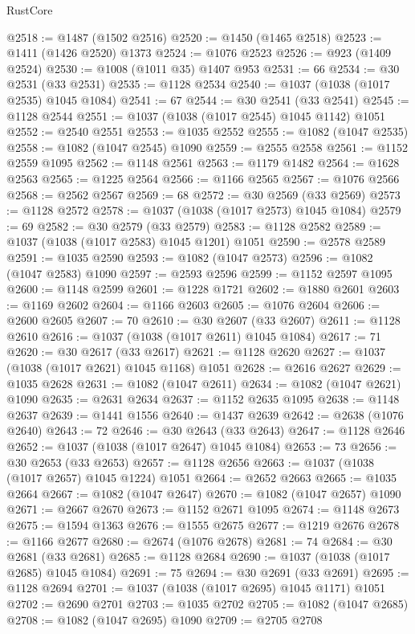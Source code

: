 \begin{lexlean}{RustCore}
\begin{coremodule}
@2518 := @1487 (@1502 @2516)
@2520 := @1450 (@1465 @2518)
@2523 := @1411 (@1426 @2520) @1373
@2524 := @1076 @2523
@2526 := @923 (@1409 @2524)
@2530 := @1008 (@1011 @35) @1407 @953
@2531 := 66
@2534 := @30 @2531 (@33 @2531)
@2535 := @1128 @2534
@2540 := @1037 (@1038 (@1017 @2535) @1045 @1084)
@2541 := 67
@2544 := @30 @2541 (@33 @2541)
@2545 := @1128 @2544
@2551 := @1037 (@1038 (@1017 @2545) @1045 @1142) @1051
@2552 := @2540 @2551
@2553 := @1035 @2552
@2555 := @1082 (@1047 @2535)
@2558 := @1082 (@1047 @2545) @1090
@2559 := @2555 @2558
@2561 := @1152 @2559 @1095
@2562 := @1148 @2561
@2563 := @1179 @1482
@2564 := @1628 @2563
@2565 := @1225 @2564
@2566 := @1166 @2565
@2567 := @1076 @2566
@2568 := @2562 @2567
@2569 := 68
@2572 := @30 @2569 (@33 @2569)
@2573 := @1128 @2572
@2578 := @1037 (@1038 (@1017 @2573) @1045 @1084)
@2579 := 69
@2582 := @30 @2579 (@33 @2579)
@2583 := @1128 @2582
@2589 := @1037 (@1038 (@1017 @2583) @1045 @1201) @1051
@2590 := @2578 @2589
@2591 := @1035 @2590
@2593 := @1082 (@1047 @2573)
@2596 := @1082 (@1047 @2583) @1090
@2597 := @2593 @2596
@2599 := @1152 @2597 @1095
@2600 := @1148 @2599
@2601 := @1228 @1721
@2602 := @1880 @2601
@2603 := @1169 @2602
@2604 := @1166 @2603
@2605 := @1076 @2604
@2606 := @2600 @2605
@2607 := 70
@2610 := @30 @2607 (@33 @2607)
@2611 := @1128 @2610
@2616 := @1037 (@1038 (@1017 @2611) @1045 @1084)
@2617 := 71
@2620 := @30 @2617 (@33 @2617)
@2621 := @1128 @2620
@2627 := @1037 (@1038 (@1017 @2621) @1045 @1168) @1051
@2628 := @2616 @2627
@2629 := @1035 @2628
@2631 := @1082 (@1047 @2611)
@2634 := @1082 (@1047 @2621) @1090
@2635 := @2631 @2634
@2637 := @1152 @2635 @1095
@2638 := @1148 @2637
@2639 := @1441 @1556
@2640 := @1437 @2639
@2642 := @2638 (@1076 @2640)
@2643 := 72
@2646 := @30 @2643 (@33 @2643)
@2647 := @1128 @2646
@2652 := @1037 (@1038 (@1017 @2647) @1045 @1084)
@2653 := 73
@2656 := @30 @2653 (@33 @2653)
@2657 := @1128 @2656
@2663 := @1037 (@1038 (@1017 @2657) @1045 @1224) @1051
@2664 := @2652 @2663
@2665 := @1035 @2664
@2667 := @1082 (@1047 @2647)
@2670 := @1082 (@1047 @2657) @1090
@2671 := @2667 @2670
@2673 := @1152 @2671 @1095
@2674 := @1148 @2673
@2675 := @1594 @1363
@2676 := @1555 @2675
@2677 := @1219 @2676
@2678 := @1166 @2677
@2680 := @2674 (@1076 @2678)
@2681 := 74
@2684 := @30 @2681 (@33 @2681)
@2685 := @1128 @2684
@2690 := @1037 (@1038 (@1017 @2685) @1045 @1084)
@2691 := 75
@2694 := @30 @2691 (@33 @2691)
@2695 := @1128 @2694
@2701 := @1037 (@1038 (@1017 @2695) @1045 @1171) @1051
@2702 := @2690 @2701
@2703 := @1035 @2702
@2705 := @1082 (@1047 @2685)
@2708 := @1082 (@1047 @2695) @1090
@2709 := @2705 @2708

\end{coremodule}
\end{lexlean}
